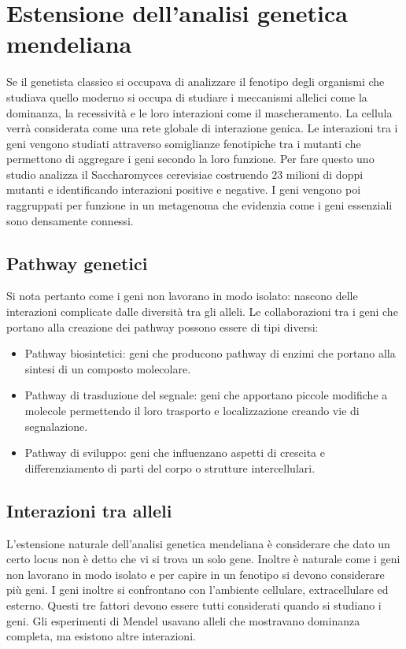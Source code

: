 \chapter{Estensione dell'analisi genetica mendeliana}
Se il genetista classico si occupava di analizzare il fenotipo degli organismi che studiava quello moderno si occupa di studiare i meccanismi allelici come la dominanza, la 
recessivit\`a e le loro interazioni come il mascheramento. La cellula verr\`a considerata come una rete globale di interazione genica. Le interazioni tra i geni vengono studiati 
attraverso somiglianze fenotipiche tra i mutanti che permettono di aggregare i geni secondo la loro funzione. Per fare questo uno studio analizza il Saccharomyces cerevisiae costruendo
$23$ milioni di doppi mutanti e identificando  interazioni positive e  negative. I geni vengono poi raggruppati per funzione in un metagenoma che
evidenzia come i geni essenziali sono densamente connessi. 
\section{Pathway genetici}
Si nota pertanto come i geni non lavorano in modo isolato: nascono delle interazioni complicate dalle diversit\`a tra gli alleli. Le collaborazioni tra i geni che portano alla
creazione dei pathway possono essere di tipi diversi:
\begin{itemize}
	\item Pathway biosintetici: geni che producono pathway di enzimi che portano alla sintesi di un composto molecolare.
	\item Pathway di trasduzione del segnale: geni che apportano piccole modifiche a molecole permettendo il loro trasporto e localizzazione creando vie di segnalazione.
	\item Pathway di sviluppo: geni che influenzano aspetti di crescita e differenziamento di parti del corpo o strutture intercellulari.
\end{itemize}
\section{Interazioni tra alleli}
L'estensione naturale dell'analisi genetica mendeliana \`e considerare che dato un certo locus non \`e detto che vi si trova un solo gene. Inoltre \`e naturale come i geni non 
lavorano in modo isolato e per capire in un fenotipo si devono considerare pi\`u geni. I geni inoltre si confrontano con l'ambiente cellulare, extracellulare ed esterno. Questi tre
fattori devono essere tutti considerati quando si studiano i geni. Gli esperimenti di Mendel usavano alleli che mostravano dominanza completa, ma esistono altre interazioni.
